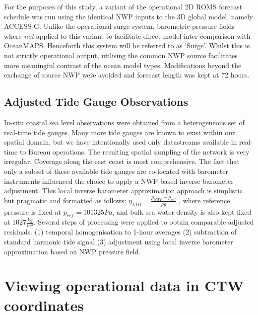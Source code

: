 For the purposes of this study, a variant of the operational 2D ROMS forecast schedule was run using the identical NWP inputs to the 3D global model, namely ACCESS-G.   
Unlike the operational surge system, barometric pressure fields where \emph{not} applied to this variant to facilitate direct model inter comparison with OceanMAPS.
Henceforth this system will be referred to as `Surge'.
Whilst this is not strictly operational output, utilising the common NWP source facilitates more meaningful contrast of the ocean model types. 
Modifications beyond the exchange of source NWP were avoided and forecast length was kept at 72 hours.


\subsection{Adjusted Tide Gauge Observations}
In-situ coastal sea level observations were obtained from a heterogeneous set of real-time tide gauges. 
Many more tide gauges are known to exist within our spatial domain, but we have intentionally used only datastreams available in real-time to Bureau operations.
The resulting spatial sampling of the network is very irregular. 
Coverage along the east coast is most comprehensive.   
The fact that only a subset of these available tide gauges are co-located with barometer instruments influenced the choice to apply a NWP-based inverse barometer adjustment.
This local inverse barometer approximation approach is simplistic \citep{Mathers:2004bk} but pragmatic and formatted as follows:
$ \eta_{LIB} = \frac{ p_{NWP} - p_{ref} }{ \rho g } $
, where reference pressure is fixed at $p_{ref}=101325Pa$, and bulk sea water density is also kept fixed at $1027\frac{kg}{m^3}$. 
Several steps of processing were applied to obtain comparable adjusted residuals.
(1) temporal homogenisation to 1-hour averages (2) subtraction of standard harmonic tide signal (3) adjustment using local inverse barometer approximation based on NWP pressure field.

\section{Viewing operational data in CTW coordinates}

